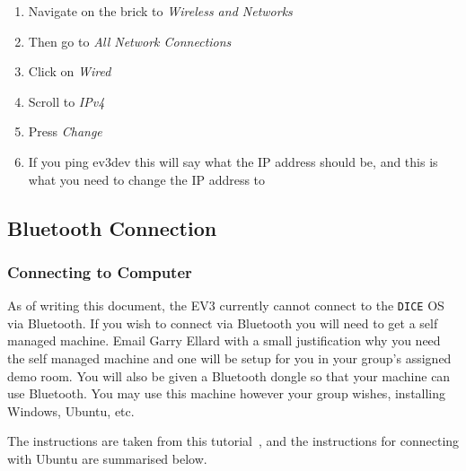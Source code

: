 \documentclass{article}
\begin{document}
\begin{enumerate}
    \item Navigate on the brick to \textit{Wireless and Networks}
    \item Then go to \textit{All Network Connections}
    \item Click on \textit{Wired}
    \item Scroll to \textit{IPv4}
    \item Press \textit{Change}
    \item If you ping ev3dev this will say what the IP address should be, and this is what you need to change the IP address to
\end{enumerate}

\subsection{Bluetooth Connection}
\subsubsection{Connecting to Computer}
As of writing this document, the EV3 currently cannot connect to the \texttt{DICE} OS via Bluetooth. If you wish to connect via Bluetooth you will need to get a self managed machine. Email Garry Ellard with a small justification why you need the self managed machine and one will be setup for you in your group's assigned demo room. You will also be given a Bluetooth dongle so that your machine can use Bluetooth. You may use this machine however your group wishes, installing Windows, Ubuntu, etc.

The instructions are taken from this tutorial~\cite{connectBluetooth}, and the instructions for connecting with Ubuntu are summarised below.
\end{document}
